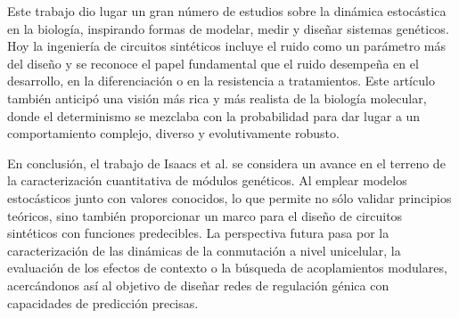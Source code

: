 \documentclass[nochap]{config/ejercicios}
\begin{document}

Este trabajo dio lugar un gran número de estudios sobre la dinámica estocástica en la biología, inspirando formas de modelar, medir y diseñar sistemas genéticos. Hoy la ingeniería de circuitos sintéticos incluye el ruido como un parámetro más del diseño y se reconoce el papel fundamental que el ruido desempeña en el desarrollo, en la diferenciación o en la resistencia a tratamientos. Este artículo también anticipó una visión más rica y más realista de la biología molecular, donde el determinismo se mezclaba con la probabilidad para dar lugar a un comportamiento complejo, diverso y evolutivamente robusto.


En conclusión, el trabajo de Isaacs et al. se considera un avance en el terreno de la caracterización cuantitativa de módulos genéticos. Al emplear modelos estocásticos junto con valores conocidos, lo que permite no sólo validar principios teóricos, sino también proporcionar un marco para el diseño de circuitos sintéticos con funciones predecibles. La perspectiva futura pasa por la caracterización de las dinámicas de la conmutación a nivel unicelular, la evaluación de los efectos de contexto o la búsqueda de acoplamientos modulares, acercándonos así al objetivo de diseñar redes de regulación génica con capacidades de predicción precisas.

\printbibliography
\end{document}
